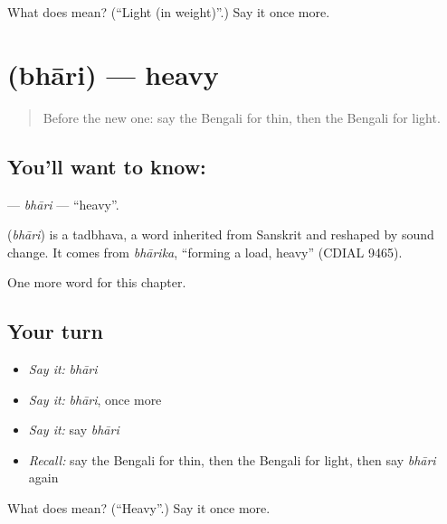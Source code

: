 \begin{tcolorbox}[breakable,colback=teal!4,colframe=teal!35!black,title={Before you move on}]
What does  mean? (\textquotedblleft{}Light (in weight)\textquotedblright{}.) Say it once more.
\end{tcolorbox}
\section[\texorpdfstring{\bn{ভারী} (bhāri)}{ভারী (bhāri)}]{ (bhāri) — heavy}

\label{lesson:BN-C76-bhari}



\begin{quote}
Before the new one: say the Bengali for thin, then the Bengali for light.
\end{quote}

\subsection*{You'll want to know: }
\textbf{} — \emph{bhāri} — \textquotedblleft{}heavy\textquotedblright{}.

\begin{cousinweb}
\textbf{} (\emph{bhāri}) is a tadbhava, a word inherited from Sanskrit and reshaped by sound change. It comes from \emph{bhārika}, \textquotedblleft{}forming a load, heavy\textquotedblright{} (CDIAL 9465).
\end{cousinweb}

\begin{grammarlens}[title={What you've built}]
One more word for this chapter.
\end{grammarlens}

\subsection*{Your turn}
\begin{itemize}
\raggedright
  \item \emph{Say it:} \emph{bhāri}
  \item \emph{Say it:} \emph{bhāri}, once more
  \item \emph{Say it:} say \emph{bhāri}
  \item \emph{Recall:} say the Bengali for thin, then the Bengali for light, then say \emph{bhāri} again
\end{itemize}

\begin{tcolorbox}[breakable,colback=teal!4,colframe=teal!35!black,title={Before you move on}]
What does  mean? (\textquotedblleft{}Heavy\textquotedblright{}.) Say it once more.
\end{tcolorbox}
